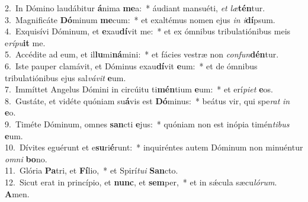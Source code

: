 {2.~}In Dómino laudábitur \textbf{á}nima \textbf{me}a:~* áudiant mansuéti, \textit{et} \textit{læ}\textbf{tén}tur.\\
{3.~}Magnificáte \textbf{Dó}minum \textbf{me}cum:~* et exaltémus nomen ejus \textit{in} \textit{i}\textbf{dí}psum.\\
{4.~}Exquisívi Dóminum, et \textbf{e}xau\textbf{dí}vit me:~* et ex ómnibus tribulatiónibus meis e\textit{rí}\textit{pu}\textbf{it} me.\\
{5.~}Accédite ad eum, et il\textbf{lu}mi\textbf{ná}mini:~* et fácies vestræ non \textit{con}\textit{fun}\textbf{dén}tur.\\
{6.~}Iste pauper clamávit, et Dóminus exau\textbf{dí}vit \textbf{e}um:~* et de ómnibus tribulatiónibus ejus sal\textit{vá}\textit{vit} \textbf{e}um.\\
{7.~}Immíttet Angelus Dómini in circúitu ti\textbf{mén}tium \textbf{e}um:~* et erí\textit{pi}\textit{et} \textbf{e}os.\\
{8.~}Gustáte, et vidéte quóniam su\textbf{á}vis est \textbf{Dó}minus:~* beátus vir, qui spe\textit{rat} \textit{in} \textbf{e}o.\\
{9.~}Timéte Dóminum, omnes \textbf{san}cti \textbf{e}jus:~* quóniam non est inópia timén\textit{ti}\textit{bus} \textbf{e}um.\\
{10.~}Dívites eguérunt et e\textbf{su}ri\textbf{é}runt:~* inquiréntes autem Dóminum non minuéntur \textit{om}\textit{ni} \textbf{bo}no.\\
{11.~}Glória \textbf{Pa}tri, et \textbf{Fí}lio,~* et Spirí\textit{tu}\textit{i} \textbf{San}cto.\\
{12.~}Sicut erat in princípio, et \textbf{nunc}, et \textbf{sem}per,~* et in sǽcula sæcu\textit{ló}\textit{rum}. \textbf{A}men.\\
